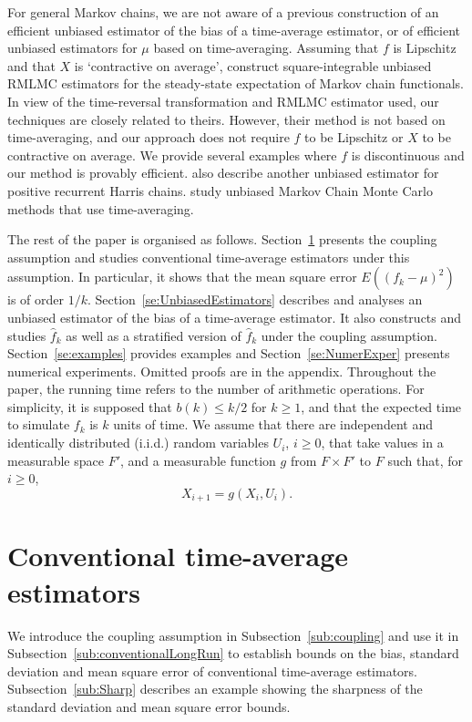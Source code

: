 \documentclass[a4paper,11pt]{article}
\begin{document}
For general Markov chains, we are not aware of a previous construction of an efficient   unbiased estimator of the bias of a time-average estimator, or of efficient unbiased estimators for \(\mu\) based on time-averaging. Assuming that \(f\) is Lipschitz and that \(X\) is `contractive on average',   \citet{glynn2014exact} construct square-integrable unbiased  RMLMC estimators for the steady-state expectation of Markov chain functionals. In view of the time-reversal transformation and  RMLMC estimator used, our techniques are  closely related to theirs. However, their method is not based on time-averaging, and our approach does not require  \(f\) to be Lipschitz or \(X\) to be contractive on average. We provide several examples where \(f\) is discontinuous and our method is provably efficient.           \citet{glynn2014exact}  also describe another unbiased estimator for positive recurrent
Harris chains. \citet{jacob2020unbiased} study unbiased Markov Chain Monte Carlo methods that use time-averaging.

The rest of the paper is organised as follows. Section~\ref{se:conventionalEstimators} presents the coupling assumption and  studies conventional time-average estimators under this assumption. In particular, it shows that the mean square error  \(E((f_{k}-\mu)^{2})\) is of order \(1/k\).
Section~\ref{se:UnbiasedEstimators} 
describes and analyses  an unbiased estimator of the bias of a time-average estimator. It also constructs  and studies   \(\hat f_{k}\) as well as a stratified version of   \(\hat f_{k}\)   under the coupling assumption. Section~\ref{se:examples} provides examples and Section~\ref{se:NumerExper} presents numerical experiments.
Omitted proofs are in the appendix.
Throughout the  paper, the running time refers to the number of arithmetic operations. For simplicity, it is supposed  that \( b(k)\le k/2\) for \(k\geq1\), and that the expected time to simulate  \(f_{k}\) is   \(k\) units of time. We assume   that  there are independent  and identically distributed (i.i.d.) random variables \(U_{i}\),  \(i\ge0\), that take values in a measurable space \(F'\),    and a measurable
function \(g\) from \(F\times F'\) to \(F\) such
that, for \( i\geq 0\), \begin{equation}\label{eq:recXi}
X_{i+1}=g(X_{i},U_{i}).
\end{equation} 
\section{Conventional time-average estimators}\label{se:conventionalEstimators} 
We introduce the coupling assumption in Subsection~\ref{sub:coupling} and use it in Subsection~\ref{sub:conventionalLongRun} to  establish bounds  on the bias, standard deviation and mean square error of conventional time-average estimators. Subsection~\ref{sub:Sharp}  describes an example showing the sharpness of the standard deviation and mean square error bounds.        
\end{document}
